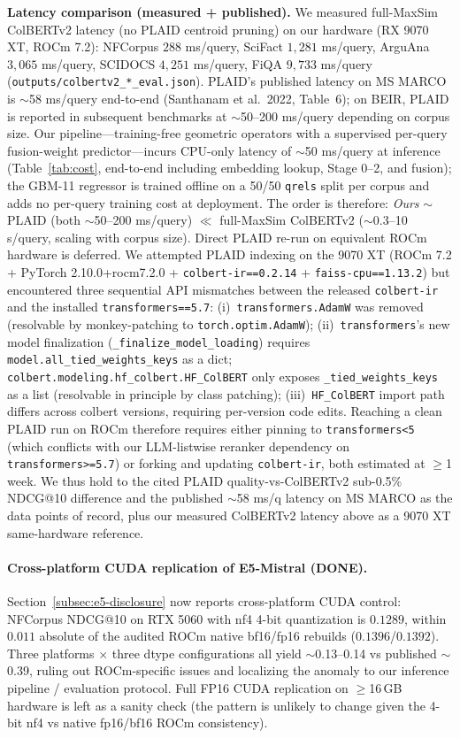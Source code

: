 \documentclass[review,1p]{elsarticle}
\begin{document}
\textbf{Latency comparison (measured + published).} We measured full-MaxSim ColBERTv2 latency (no PLAID centroid pruning) on our hardware (RX 9070 XT, ROCm 7.2): NFCorpus $288$ ms/query, SciFact $1{,}281$ ms/query, ArguAna $3{,}065$ ms/query, SCIDOCS $4{,}251$ ms/query, FiQA $9{,}733$ ms/query (\texttt{outputs/colbertv2\_*\_eval.json}). PLAID's published latency on MS MARCO is $\sim$58 ms/query end-to-end (Santhanam et al.\ 2022, Table~6); on BEIR, PLAID is reported in subsequent benchmarks at $\sim$50--200 ms/query depending on corpus size. Our pipeline---training-free geometric operators with a supervised per-query fusion-weight predictor---incurs CPU-only latency of $\sim$50 ms/query at inference (Table~\ref{tab:cost}, end-to-end including embedding lookup, Stage 0--2, and fusion); the GBM-11 regressor is trained offline on a 50/50 \texttt{qrels} split per corpus and adds no per-query training cost at deployment. The order is therefore: \emph{Ours} $\sim$ PLAID (both $\sim$50--200 ms/query) $\ll$ full-MaxSim ColBERTv2 ($\sim$0.3--10 s/query, scaling with corpus size). Direct PLAID re-run on equivalent ROCm hardware is deferred. We attempted PLAID indexing on the 9070 XT (ROCm 7.2 + PyTorch 2.10.0+rocm7.2.0 + \texttt{colbert-ir==0.2.14} + \texttt{faiss-cpu==1.13.2}) but encountered three sequential API mismatches between the released \texttt{colbert-ir} and the installed \texttt{transformers==5.7}: (i)~\texttt{transformers.AdamW} was removed (resolvable by monkey-patching to \texttt{torch.optim.AdamW}); (ii)~\texttt{transformers}'s new model finalization (\texttt{\_finalize\_model\_loading}) requires \texttt{model.all\_tied\_weights\_keys} as a dict; \texttt{colbert.modeling.hf\_colbert.HF\_ColBERT} only exposes \texttt{\_tied\_weights\_keys} as a list (resolvable in principle by class patching); (iii)~\texttt{HF\_ColBERT} import path differs across colbert versions, requiring per-version code edits. Reaching a clean PLAID run on ROCm therefore requires either pinning to \texttt{transformers<5} (which conflicts with our LLM-listwise reranker dependency on \texttt{transformers>=5.7}) or forking and updating \texttt{colbert-ir}, both estimated at $\geq$1 week. We thus hold to the cited PLAID quality-vs-ColBERTv2 sub-0.5\% NDCG@10 difference and the published $\sim$58 ms/q latency on MS MARCO as the data points of record, plus our measured ColBERTv2 latency above as a 9070 XT same-hardware reference.

\paragraph{Cross-platform CUDA replication of E5-Mistral (DONE).} Section~\ref{subsec:e5-disclosure} now reports cross-platform CUDA control: NFCorpus NDCG@10 on RTX 5060 with nf4 4-bit quantization is $0.1289$, within $0.011$ absolute of the audited ROCm native bf16/fp16 rebuilds ($0.1396$/$0.1392$). Three platforms $\times$ three dtype configurations all yield $\sim$0.13--0.14 vs published $\sim$0.39, ruling out ROCm-specific issues and localizing the anomaly to our inference pipeline / evaluation protocol. Full FP16 CUDA replication on $\geq$16\,GB hardware is left as a sanity check (the pattern is unlikely to change given the 4-bit nf4 vs native fp16/bf16 ROCm consistency).
\end{document}

